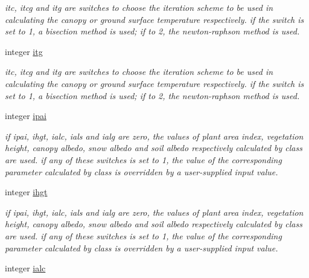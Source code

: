 \begin{DoxyCompactItemize}
\begin{DoxyCompactList}\small\item\em itc, itcg and itg are switches to choose the iteration scheme to be used in calculating the canopy or ground surface temperature respectively. if the switch is set to 1, a bisection method is used; if to 2, the newton-\/raphson method is used. \end{DoxyCompactList}\item 
\hypertarget{structctem__statevars_1_1ctem__switches_a9375ef96f339629b2d18c24bb4fa1978}{}integer \hyperlink{structctem__statevars_1_1ctem__switches_a9375ef96f339629b2d18c24bb4fa1978}{itg}\label{structctem__statevars_1_1ctem__switches_a9375ef96f339629b2d18c24bb4fa1978}

\begin{DoxyCompactList}\small\item\em itc, itcg and itg are switches to choose the iteration scheme to be used in calculating the canopy or ground surface temperature respectively. if the switch is set to 1, a bisection method is used; if to 2, the newton-\/raphson method is used. \end{DoxyCompactList}\item 
\hypertarget{structctem__statevars_1_1ctem__switches_aee2479d5348ac55b7a91de5fd5ab9e98}{}integer \hyperlink{structctem__statevars_1_1ctem__switches_aee2479d5348ac55b7a91de5fd5ab9e98}{ipai}\label{structctem__statevars_1_1ctem__switches_aee2479d5348ac55b7a91de5fd5ab9e98}

\begin{DoxyCompactList}\small\item\em if ipai, ihgt, ialc, ials and ialg are zero, the values of plant area index, vegetation height, canopy albedo, snow albedo and soil albedo respectively calculated by class are used. if any of these switches is set to 1, the value of the corresponding parameter calculated by class is overridden by a user-\/supplied input value. \end{DoxyCompactList}\item 
\hypertarget{structctem__statevars_1_1ctem__switches_a47a6f485fb666768540319f4b6376eeb}{}integer \hyperlink{structctem__statevars_1_1ctem__switches_a47a6f485fb666768540319f4b6376eeb}{ihgt}\label{structctem__statevars_1_1ctem__switches_a47a6f485fb666768540319f4b6376eeb}

\begin{DoxyCompactList}\small\item\em if ipai, ihgt, ialc, ials and ialg are zero, the values of plant area index, vegetation height, canopy albedo, snow albedo and soil albedo respectively calculated by class are used. if any of these switches is set to 1, the value of the corresponding parameter calculated by class is overridden by a user-\/supplied input value. \end{DoxyCompactList}\item 
\hypertarget{structctem__statevars_1_1ctem__switches_af087bbe88e88b2979b5938c344207b80}{}integer \hyperlink{structctem__statevars_1_1ctem__switches_af087bbe88e88b2979b5938c344207b80}{ialc}\label{structctem__statevars_1_1ctem__switches_af087bbe88e88b2979b5938c344207b80}


\end{DoxyCompactItemize}
